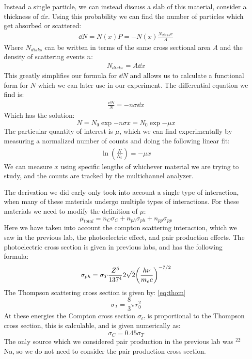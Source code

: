 \documentclass[letterpaper,12pt]{article}
\begin{document}
Instead a single particle, we can instead discuss a slab of this material, consider a thickness of $\dd{x}$. Using this probability we can find the number of particles which get absorbed or scattered:
\begin{align*}
  \dd{N}=N(x)P=-N(x)\frac{N_{disks}\sigma}{A}
\end{align*}
Where $N_{disks}$ can be written in terms of the same cross sectional area $A$ and the density of scattering events $n$:
\begin{align*}
  N_{disks}=A\dd{x}
\end{align*}
This greatly simplifies our formula for $\dd{N}$ and allows us to calculate a functional form for $N$ which we can later use in our experiment. The differential equation we find is:
\begin{align*}
  \frac{\dd{N}}{N}=-n\sigma\dd{x}
\end{align*}
Which has the solution:
\begin{equation}
  \label{eq:soln}
  N=N_0\exp{-n\sigma x}=N_0\exp{-\mu x}
\end{equation}
The particular quantity of interest is $\mu$, which we can find experimentally by measuring a normalized number of counts and doing the following linear fit:
\begin{align*}
  \ln(\frac{N}{N_0})=-\mu x
\end{align*}
We can measure $x$ using specific lengths of whichever material we are trying to study, and the counts are tracked by the multichannel analyzer.

The derivation we did early only took into account a single type of interaction, when many of these materials undergo multiple types of interactions. For these materials we need to modify the definition of $\mu$:
\begin{equation}
  \label{eq:mutot}
  \mu_{total}=n_{C}\sigma_C+n_{ph}\sigma_{ph}+n_{pp}\sigma_{pp}
\end{equation}
Here we have taken into account the compton scattering interaction, which we saw in the previous lab, the photoelectric effect, and pair production effects. The photoelectric cross section is given in previous labs, and has the following formula:
\begin{equation}
  \label{eq:ph}
  \sigma_{ph}=\sigma_T\frac{Z^5}{137^4}2\sqrt{2}\qty(\frac{h\nu}{m_ec})^{-7/2}
\end{equation}
The Thompson scattering cross section is given by: \eqref{eq:thom}
\begin{equation}
  \label{eq:thom}
  \sigma_T=\frac{8}{3}\pi r_0^2
\end{equation}
At these energies the Compton cross section $\sigma_C$ is proportional to the Thompson cross section, this is calculable, and is given numerically as:
\begin{equation}
  \label{eq:compt}
  \sigma_C=0.45\sigma_T
\end{equation}
The only source which we considered pair production in the previous lab was $^{22}$Na, so we do not need to consider the pair production cross section.
\end{document}
